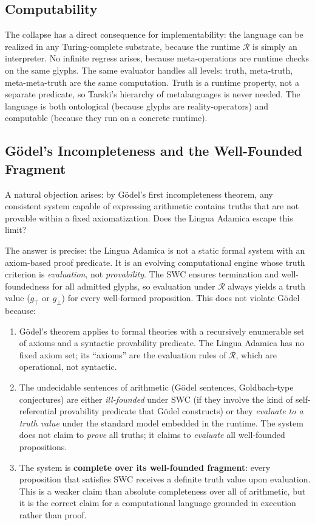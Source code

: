 \documentclass[12pt, letterpaper]{book}
\def\mathfrak#1{#1}%
\begin{document}
\subsection{Computability}

The collapse has a direct consequence for implementability: the language can be realized in any Turing-complete substrate, because the runtime $\mathcal{R}$ is simply an interpreter. No infinite regress arises, because meta-operations are runtime checks on the same glyphs. The same evaluator handles all levels: truth, meta-truth, meta-meta-truth are the same computation. Truth is a runtime property, not a separate predicate, so Tarski's hierarchy of metalanguages is never needed. The language is both ontological (because glyphs are reality-operators) and computable (because they run on a concrete runtime).

\subsection{G\"odel's Incompleteness and the Well-Founded Fragment}

A natural objection arises: by G\"odel's first incompleteness theorem, any consistent system capable of expressing arithmetic contains truths that are not provable within a fixed axiomatization. Does the Lingua Adamica escape this limit?

The answer is precise: the Lingua Adamica is not a static formal system with an axiom-based proof predicate. It is an evolving computational engine whose truth criterion is \textit{evaluation}, not \textit{provability}. The SWC ensures termination and well-foundedness for all admitted glyphs, so evaluation under $\mathcal{R}$ always yields a truth value ($\mathfrak{g}_\top$ or $\mathfrak{g}_\bot$) for every well-formed proposition. This does not violate G\"odel because:

\begin{enumerate}[label=(\roman*)]
    \item G\"odel's theorem applies to formal theories with a recursively enumerable set of axioms and a syntactic provability predicate. The Lingua Adamica has no fixed axiom set; its ``axioms'' are the evaluation rules of $\mathcal{R}$, which are operational, not syntactic.
    \item The undecidable sentences of arithmetic (G\"odel sentences, Goldbach-type conjectures) are either \textit{ill-founded} under SWC (if they involve the kind of self-referential provability predicate that G\"odel constructs) or they \textit{evaluate to a truth value} under the standard model embedded in the runtime. The system does not claim to \textit{prove} all truths; it claims to \textit{evaluate} all well-founded propositions.
    \item The system is \textbf{complete over its well-founded fragment}: every proposition that satisfies SWC receives a definite truth value upon evaluation. This is a weaker claim than absolute completeness over all of arithmetic, but it is the correct claim for a computational language grounded in execution rather than proof.
\end{enumerate}
\end{document}
